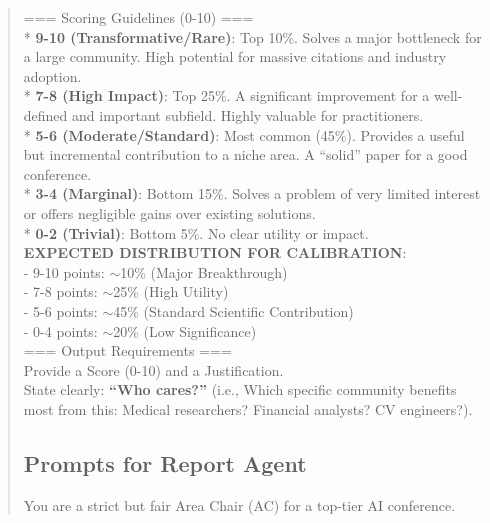 \begin{quote}
\begin{tcolorbox}[breakable,colback=eval!20!white, colframe=eval!60!black, title=\textbf{Prompt for Evaluation Agent - Significance}]
        === Scoring Guidelines (0-10) ===\\
        * \textbf{9-10 (Transformative/Rare)}: Top 10\%. Solves a major bottleneck for a large community. High potential for massive citations and industry adoption.\\
        * \textbf{7-8 (High Impact)}: Top 25\%. A significant improvement for a well-defined and important subfield. Highly valuable for practitioners.\\
        * \textbf{5-6 (Moderate/Standard)}: Most common (45\%). Provides a useful but incremental contribution to a niche area. A ``solid'' paper for a good conference.\\
        * \textbf{3-4 (Marginal)}: Bottom 15\%. Solves a problem of very limited interest or offers negligible gains over existing solutions.\\
        * \textbf{0-2 (Trivial)}: Bottom 5\%. No clear utility or impact.\\

        \textbf{EXPECTED DISTRIBUTION FOR CALIBRATION}:\\
        - 9-10 points: $\sim$10\% (Major Breakthrough)\\
        - 7-8 points: $\sim$25\% (High Utility)\\
        - 5-6 points: $\sim$45\% (Standard Scientific Contribution)\\
        - 0-4 points: $\sim$20\% (Low Significance)\\

        === Output Requirements ===\\
        Provide a Score (0-10) and a Justification. \\
        State clearly: \textbf{``Who cares?''} (i.e., Which specific community benefits most from this: Medical researchers? Financial analysts? CV engineers?).\\
    \end{tcolorbox}

\subsection{Prompts for Report Agent}
\label{app:prompts_report}

    \begin{tcolorbox}[breakable,colback=report!20!white, colframe=report!60!black, title=\textbf{Prompt for Report Agent (Meta-Review)}]
    \label{app:prompt_report_meta}
        You are a strict but fair Area Chair (AC) for a top-tier AI conference.\\


\end{tcolorbox}
\end{quote}
